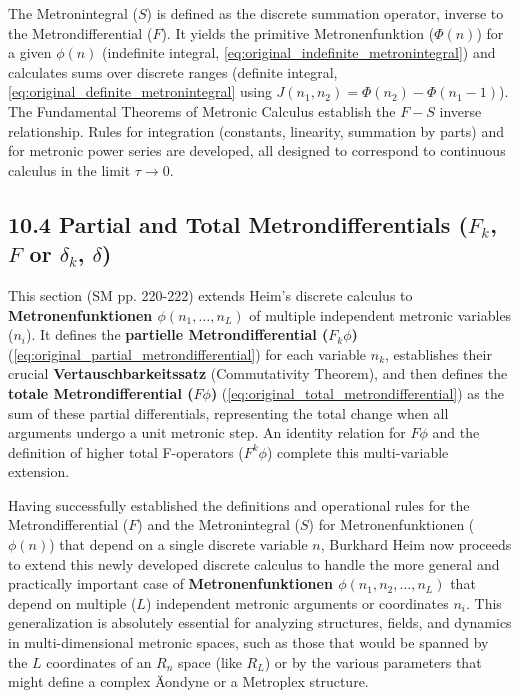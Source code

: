 \documentclass[12pt]{article}
\newcommand{\semantischermetrophor}{R_n}
\newcommand{\metron}{\tau}
\newcommand{\metrondifferential}{F} %
\newcommand{\metronintegral}{S} %
\newcommand{\metronenfunktion}{\phi(n)}
\newcommand{\metronenziffer}{n}
\begin{document}
The Metronintegral (\(\metronintegral\)) is defined as the discrete summation operator, inverse to the Metrondifferential (\(\metrondifferential\)). It yields the primitive Metronenfunktion (\(\Phi(n)\)) for a given \(\phi(n)\) (indefinite integral, \eqref{eq:original_indefinite_metronintegral}) and calculates sums over discrete ranges (definite integral, \eqref{eq:original_definite_metronintegral} using \(J(n_1,n_2) = \Phi(n_2) - \Phi(n_1-1)\)). The Fundamental Theorems of Metronic Calculus establish the \(F-S\) inverse relationship. Rules for integration (constants, linearity, summation by parts) and for metronic power series are developed, all designed to correspond to continuous calculus in the limit \(\metron \to 0\).

\subsection{10.4 Partial and Total Metrondifferentials (\texorpdfstring{\( F_k \)}{Fk}, \texorpdfstring{\( F \)}{F} or \texorpdfstring{\( \delta_k \)}{delta-k}, \texorpdfstring{\( \delta \)}{delta})}
\label{sec:partial_total_delta}

This section (SM pp. 220-222) extends Heim's discrete calculus to \textbf{Metronenfunktionen \( \phi(n_1, \dots, n_L) \)} of multiple independent metronic variables (\(n_i\)). It defines the \textbf{partielle Metrondifferential (\(F_k\phi\))} (\eqref{eq:original_partial_metrondifferential}) for each variable \(n_k\), establishes their crucial \textbf{Vertauschbarkeitssatz} (Commutativity Theorem), and then defines the \textbf{totale Metrondifferential (\(F\phi\))} (\eqref{eq:original_total_metrondifferential}) as the sum of these partial differentials, representing the total change when all arguments undergo a unit metronic step. An identity relation for \(F\phi\) and the definition of higher total F-operators (\(F^k\phi\)) complete this multi-variable extension.

Having successfully established the definitions and operational rules for the Metrondifferential (\( \metrondifferential \)) and the Metronintegral (\( \metronintegral \)) for Metronenfunktionen (\( \metronenfunktion \)) that depend on a single discrete variable \( \metronenziffer \), Burkhard Heim now proceeds to extend this newly developed discrete calculus to handle the more general and practically important case of \textbf{Metronenfunktionen \( \phi(n_1, n_2, \dots, n_L) \)} that depend on multiple (\( L \)) independent metronic arguments or coordinates \( n_i \). This generalization is absolutely essential for analyzing structures, fields, and dynamics in multi-dimensional metronic spaces, such as those that would be spanned by the \( L \) coordinates of an \( \semantischermetrophor \) space (like \(R_L\)) or by the various parameters that might define a complex Äondyne or a Metroplex structure.
\end{document}
